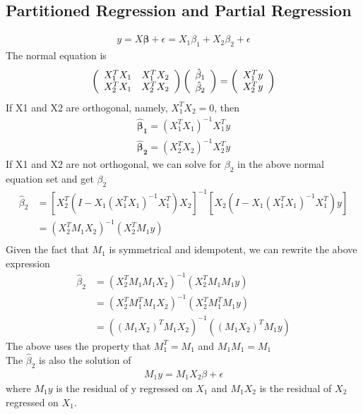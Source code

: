 \documentclass[a4paper]{article}
\begin{document}
\subsection{Partitioned Regression and Partial Regression}
\begin{align*}
y = X \boldsymbol \beta + \epsilon = X_1 \beta_1 + X_2 \beta_2 + \epsilon
\end{align*}
The normal equation is
\begin{align*}
 \left( \begin{array} { c  c } 
                   X_1^TX_1 & X_1^TX_2  \\
                   X_2^TX_1 & X_2^TX_2   \\
           \end{array} \right)
 \left( \begin{array} { c  } 
                   \hat \beta_1   \\
                   \hat \beta_2   \\
           \end{array} \right) =
\left( \begin{array} { c  } 
                   X_1^T y   \\
                   X_2^T y   \\
           \end{array} \right)
\end{align*}
If X1 and X2 are orthogonal, namely, $X_1^T X_2=0$, then 
\begin{align*}
\boldsymbol {\hat  \beta_1} = (X_1^T X_1)^{-1} X_1^Ty\\
\boldsymbol {\hat  \beta_2} = (X_2^T X_2)^{-1} X_2^Ty
\end{align*}
If X1 and X2 are not orthogonal, we can solve for $\beta_2$ in the above normal equation set and get $\beta_2$
\begin{align*}
\hat \beta_2 & = [X_2^T(I-X_1(X_1^TX_1)^{-1}X_1^T)X_2]^{-1}[X_2(I-X_1(X_1^TX_1)^{-1}X_1^T)y]\\
& = (X_2^T M_1X_2)^{-1}(X_2^T  M_1y) \\
\end{align*}
Given the fact that $M_1$ is symmetrical and idempotent, we can rewrite the above expression
\begin{align*}
\hat \beta_2
& = (X_2^T M_1 M_1X_2)^{-1}(X_2^T M_1 M_1y) \\
& = (X_2^T M_1^T M_1X_2)^{-1}(X_2^TM_1^T M_1y) \\
& = ((M_1 X_2)^T  M_1X_2)^{-1}((M_1 X_2)^T M_1y) 
\end{align*}
The above uses the property that $M_1^T=M_1$ and $M_1 M_1 = M_1$\\
The $\hat \beta_2$ is also the solution of 
\begin{align*}
 M_1 y = M_1 X_2 \beta + \epsilon
\end{align*}
where $M_1 y$ is the residual of y regressed on $X_1$ and $M_1 X_2$ is the residual of $X_2$ regressed on $X_1$.
\end{document}
